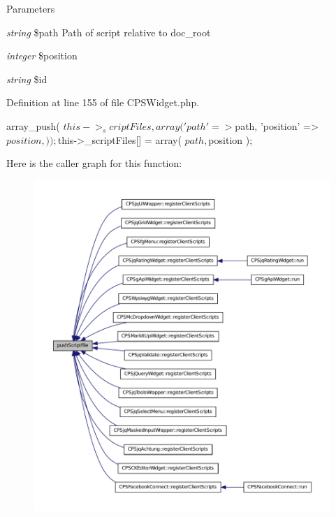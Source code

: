 \begin{DoxyParams}{Parameters}
\item[{\em string}]\$path Path of script relative to doc\_\-root \item[{\em integer}]\$position \item[{\em string}]\$id \end{DoxyParams}


Definition at line 155 of file CPSWidget.php.




\begin{DoxyCode}
    {
        array_push(
            $this->_scriptFiles,
            array(
                'path' => $path,
                'position' => $position,
            )
        );

        $this->_scriptFiles[] = array( $path, $position );
    }
\end{DoxyCode}




Here is the caller graph for this function:\nopagebreak
\begin{figure}[H]
\begin{center}
\leavevmode
\includegraphics[width=400pt]{classCPSWidget_a4589f8bb22c9e9837302ea2cc7c80570_icgraph}
\end{center}
\end{figure}


